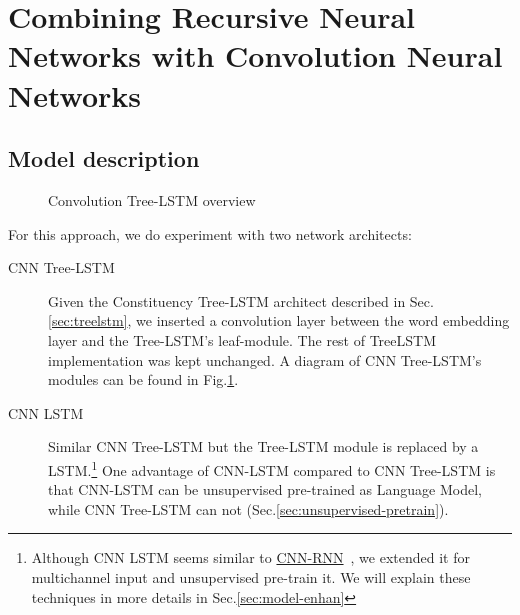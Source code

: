 \hypertarget{sec:CNNtree}{\section{Combining Recursive Neural Networks with Convolution Neural Networks}}\label{sec:CNNtree}
\subsection{Model description}
\begin{figure}[H]
    \centering
    \caption[Convolution Tree-LSTM overview]{Convolution Tree-LSTM overview}
    \label{fig:convtreelstmsummary}
\end{figure}
For this approach, we do experiment with two network architects:
\begin{description}
\item[CNN Tree-LSTM] Given the Constituency Tree-LSTM architect described in Sec.\ref{sec:treelstm},  we inserted a convolution layer between the word embedding layer and the Tree-LSTM's leaf-module.
The rest of TreeLSTM implementation was kept unchanged.
A diagram of CNN Tree-LSTM's modules can be found in Fig.\ref{fig:convtreelstmsummary}.
\item[CNN LSTM] Similar CNN Tree-LSTM but the Tree-LSTM module is replaced by a LSTM.\footnote{Although CNN LSTM seems similar to \hyperref[cnn-rnn]{CNN-RNN}~\cite{cnn-rnn}, we extended it for multichannel input and unsupervised pre-train it. We will explain these techniques in more details in Sec.\ref{sec:model-enhan}}
One advantage of CNN-LSTM compared to CNN Tree-LSTM is that CNN-LSTM can be unsupervised pre-trained as Language Model, while CNN Tree-LSTM can not (Sec.\ref{sec:unsupervised-pretrain}).
\end{description}

